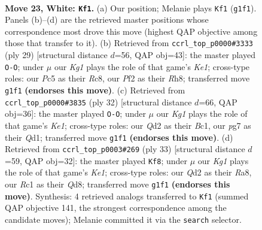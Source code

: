\documentclass[11pt]{article}
\begin{document}
\clearpage

\begin{figure}[p]\centering
\begin{subfigure}{0.46\textwidth}\centering
\resizebox{\linewidth}{!}{%
\newchessgame
\chessboard[
  setfen={1rr3k1/1p1b1ppp/2n1pq2/2Pp3P/p2P4/P1P2N2/R2QBPP1/2R3K1 w - - 3 23},
  showmover=false,
  pgfstyle=straightmove, color=movearrow, markmove={g1-f1}
]}
\caption{}
\end{subfigure}\hfill
\begin{subfigure}{0.46\textwidth}\centering
\resizebox{\linewidth}{!}{%
\newchessgame
\chessboard[
  setfen={2r1k2r/3qbppp/2p2n2/pp1p4/3P1B2/P1NQP3/1P3PPP/R4RK1 b k - 1 15},
  showmover=false,
  pgfstyle=straightmove, color=movearrow, markmove={e8-g8}
]}
\caption{}
\end{subfigure}
\\[4pt]
\begin{subfigure}{0.46\textwidth}\centering
\resizebox{\linewidth}{!}{%
\newchessgame
\chessboard[
  setfen={r4rk1/pbp3np/1pnppqp1/8/2PP1P2/P1PBP3/R4N1P/2BQK2R w K - 0 17},
  showmover=false,
  pgfstyle=straightmove, color=movearrow, markmove={e1-g1}
]}
\caption{}
\end{subfigure}\hfill
\begin{subfigure}{0.46\textwidth}\centering
\resizebox{\linewidth}{!}{%
\newchessgame
\chessboard[
  setfen={r2qk2r/pp2bp2/1np5/3p1B1p/3P2p1/2N1P1P1/PPQ2PP1/4RRK1 b kq - 0 17},
  showmover=false,
  pgfstyle=straightmove, color=movearrow, markmove={e8-f8}
]}
\caption{}
\end{subfigure}
\caption{\textbf{Move 23, White: \texttt{Kf1}.} (a) Our position; Melanie plays \texttt{Kf1} (\texttt{g1f1}). Panels (b)--(d) are the retrieved master positions whose correspondence most drove this move (highest QAP objective among those that transfer to it). (b) Retrieved from \texttt{ccrl\_top\_p0000\#3333} (ply 29) [structural distance $d$=56, QAP obj=43]: the master played \texttt{O-O}; under $\mu$ our \emph{Kg1} plays the role of that game's \emph{Ke1}; cross-type roles: our \emph{P}c5 as their \emph{R}c8, our \emph{P}f2 as their \emph{R}h8; transferred move \texttt{g1f1} \textbf{(endorses this move)}. (c) Retrieved from \texttt{ccrl\_top\_p0000\#3835} (ply 32) [structural distance $d$=66, QAP obj=36]: the master played \texttt{O-O}; under $\mu$ our \emph{Kg1} plays the role of that game's \emph{Ke1}; cross-type roles: our \emph{Q}d2 as their \emph{B}c1, our \emph{p}g7 as their \emph{Q}d1; transferred move \texttt{g1f1} \textbf{(endorses this move)}. (d) Retrieved from \texttt{ccrl\_top\_p0003\#269} (ply 33) [structural distance $d$=59, QAP obj=32]: the master played \texttt{Kf8}; under $\mu$ our \emph{Kg1} plays the role of that game's \emph{Ke1}; cross-type roles: our \emph{Q}d2 as their \emph{R}a8, our \emph{R}c1 as their \emph{Q}d8; transferred move \texttt{g1f1} \textbf{(endorses this move)}. Synthesis: 4 retrieved analogs transferred to \texttt{Kf1} (summed QAP objective 141, the strongest correspondence among the candidate moves); Melanie committed it via the \texttt{search} selector.}
\label{fig:thought-m44}
\end{figure}
\end{document}
